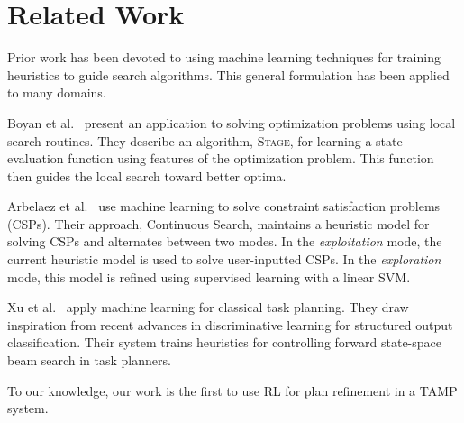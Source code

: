 \section{Related Work}
Prior work has been devoted to using machine learning techniques for
training heuristics to guide search algorithms. This general formulation
has been applied to many domains.

Boyan et al.~\cite{Boyanlearning} present an application to solving optimization
problems using local search routines. They describe an algorithm, \textsc{Stage},
for learning a state evaluation function using features of the optimization problem.
This function then guides the local search toward better optima.

Arbelaez et al.~\cite{hamadisearch} use machine learning to solve constraint
satisfaction problems (CSPs). Their approach, Continuous Search, maintains a heuristic
model for solving CSPs and alternates between two modes. In the \emph{exploitation} mode,
the current heuristic model is used to solve user-inputted CSPs. In the \emph{exploration}
mode, this model is refined using supervised learning with a linear SVM.

Xu et al.~\cite{Xu07discriminativelearning} apply machine learning for classical task
planning. They draw inspiration from recent advances in discriminative learning for
structured output classification. Their system trains heuristics for controlling forward
state-space beam search in task planners.

To our knowledge, our work is the first to use RL for plan refinement in a TAMP system.
